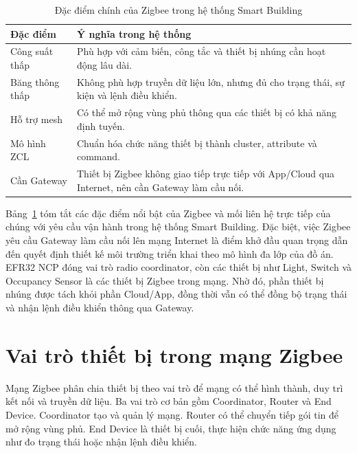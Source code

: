 \begin{table}[H]
\centering
\caption{Đặc điểm chính của Zigbee trong hệ thống Smart Building}
\label{tab:ch2-zigbee-characteristics}
\begin{tabular}{|>{\raggedright\arraybackslash}p{4cm}|>{\raggedright\arraybackslash}p{9cm}|}
\hline
\textbf{Đặc điểm} & \textbf{Ý nghĩa trong hệ thống} \\ \hline
Công suất thấp & Phù hợp với cảm biến, công tắc và thiết bị nhúng cần hoạt động lâu dài. \\ \hline
Băng thông thấp & Không phù hợp truyền dữ liệu lớn, nhưng đủ cho trạng thái, sự kiện và lệnh điều khiển. \\ \hline
Hỗ trợ mesh & Có thể mở rộng vùng phủ thông qua các thiết bị có khả năng định tuyến. \\ \hline
Mô hình ZCL & Chuẩn hóa chức năng thiết bị thành cluster, attribute và command. \\ \hline
Cần Gateway & Thiết bị Zigbee không giao tiếp trực tiếp với App/Cloud qua Internet, nên cần Gateway làm cầu nối. \\ \hline
\end{tabular}
\end{table}

Bảng~\ref{tab:ch2-zigbee-characteristics} tóm tắt các đặc điểm nổi bật của Zigbee và mối liên hệ trực tiếp của chúng với yêu cầu vận hành trong hệ thống Smart Building. Đặc biệt, việc Zigbee yêu cầu Gateway làm cầu nối lên mạng Internet là điểm khở đầu quan trọng dẫn đến quyết định thiết kế môi trường triển khai theo mô hình đa lớp của đồ án. EFR32 NCP đóng vai trò radio coordinator, còn các thiết bị như Light, Switch và Occupancy Sensor là các thiết bị Zigbee trong mạng. Nhờ đó, phần thiết bị nhúng được tách khỏi phần Cloud/App, đồng thời vẫn có thể đồng bộ trạng thái và nhận lệnh điều khiển thông qua Gateway.

\section{Vai trò thiết bị trong mạng Zigbee}
\label{sec:ch2-zigbee-roles}

Mạng Zigbee phân chia thiết bị theo vai trò để mạng có thể hình thành, duy trì kết nối và truyền dữ liệu. Ba vai trò cơ bản gồm Coordinator, Router và End Device. Coordinator tạo và quản lý mạng. Router có thể chuyển tiếp gói tin để mở rộng vùng phủ. End Device là thiết bị cuối, thực hiện chức năng ứng dụng như đo trạng thái hoặc nhận lệnh điều khiển.

